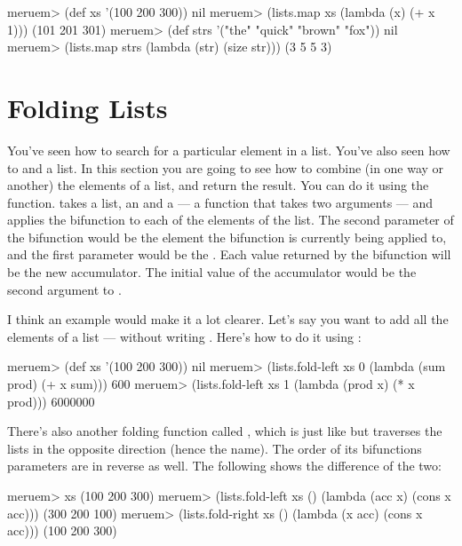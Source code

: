 \begin{REPL}
meruem> (def xs '(100 200 300))
nil
meruem> (lists.map xs (lambda (x) (+ x 1)))
(101 201 301)
meruem> (def strs '("the" "quick" "brown" "fox"))
nil
meruem> (lists.map strs (lambda (str) (size str)))
(3 5 5 3)
\end{REPL}

\section{Folding Lists}
You've seen how to search for a particular element in a list. You've also seen how to  and  a list. In this section you are going to see how to combine (in one way or another) the elements of a list, and return the result.  You can do it using the  function.   takes a list, an  and a  --- a function that takes two arguments --- and applies the bifunction to each of the elements of the list. The second parameter of the bifunction would be the element the bifunction is currently being applied to, and the first parameter would be the . Each value returned by the bifunction will be the new accumulator. The initial value of the accumulator would be the second argument to . 

I think an example would make it a lot clearer. Let's say you want to add all the elements of a list --- without writing . Here's how to do it using :

\begin{REPL}
meruem> (def xs '(100 200 300))
nil
meruem> (lists.fold-left xs 0 (lambda (sum prod) (+ x sum)))
600
meruem> (lists.fold-left xs 1 (lambda (prod x) (* x prod)))
6000000
\end{REPL}

There's also another folding function called , which is just like  but traverses the lists in the opposite direction (hence the name). The order of its bifunctions parameters are in reverse as well. The following shows the difference of the two:

\begin{REPL}
meruem> xs
(100 200 300)
meruem> (lists.fold-left xs () (lambda (acc x) (cons x acc)))
(300 200 100)
meruem> (lists.fold-right xs () (lambda (x acc) (cons x acc)))
(100 200 300)
\end{REPL}